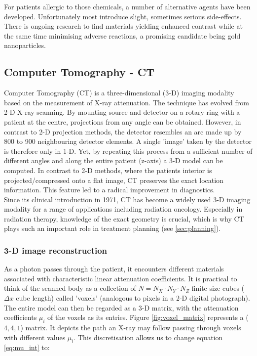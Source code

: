 For patients allergic to those chemicals, a number of alternative agents have been developed.
Unfortunately most introduce slight, sometimes serious side-effects.
There is ongoing research to find materials yielding enhanced contrast while at the same time minimising adverse reactions, a promising candidate being gold nanoparticles. \cite{Podgorsak, Maidment2014}


\subsection{Computer Tomography - CT}

Computer Tomography (CT) is a three-dimensional (3-D) imaging modality based on the measurement of X-ray attenuation.
The technique has evolved from 2-D X-ray scanning.
By mounting source and detector on a rotary ring with a patient at the centre, projections from any angle can be obtained.
However, in contrast to 2-D projection methods, the detector resembles an arc made up by 800 to 900 neighbouring detector elements.
A single 'image' taken by the detector is therefore only in 1-D.
Yet, by repeating this process from a sufficient number of different angles and along the entire patient (z-axis) a 3-D model can be computed.
In contrast to 2-D methods, where the patients interior is projected/compressed onto a flat image, CT preserves the exact location information. This feature led to a radical improvement in diagnostics.	 \\

Since its clinical introduction in 1971, CT has become a widely used 3-D imaging modality for a range of applications including radiation oncology. Especially in radiation therapy, knowledge of the exact geometry is crucial, which is why CT plays such an important role in treatment planning (see \ref{sec:planning}). \cite{Podgorsak, Maidment2014}

\subsubsection{3-D image reconstruction}
As a photon passes through the patient, it encounters different materials associated with characteristic linear attenuation coefficients.
It is practical to think of the scanned body as a collection of $N = N_X\cdot N_Y\cdot N_Z$ finite size cubes ($\Delta x$ cube length) called 'voxels' (analogous to pixels in a 2-D digital photograph).
The entire model can then be regarded as a 3-D matrix, with the attenuation coefficients $\mu_i$ of the voxels as its entries.
Figure \ref{fig:voxel_matrix} represents a ($4, 4, 1$) matrix.
It depicts the path an X-ray may follow passing through voxels with different values $\mu_i$.
This discretisation allows us to change equation \ref{eq:mu_int} to:

